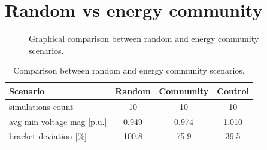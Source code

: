 \documentclass[a4paper,10pt]{report}
\begin{document}
\section{Random vs energy community}\label{section_rand_vs_comm}
\FloatBarrier
\begin{figure}[htpb]
	\centering
	\qquad
	\caption[Graphical comparison between random and energy community scenarios]{Graphical comparison between random and energy community scenarios.}%
	\label{random_vs_en_comm}%
\end{figure}
\FloatBarrier


\begin{table}[htpb]
	\centering
	\begin{tabular}{lccc}
		\toprule
		Scenario & Random & Community & Control \\
		\midrule
		simulations count & 10 & 10 & 10 \\
		avg min voltage mag [p.u.] & 0.949 & 0.974 & 1.010 \\
		bracket deviation [\%] & 100.8 & 75.9 & 39.5 \\
		\bottomrule
	\end{tabular}
	\label{random_vs_comm}
	\caption[Comparison between random and energy community scenarios]{Comparison between random and energy community scenarios.}
\end{table}
\end{document}

